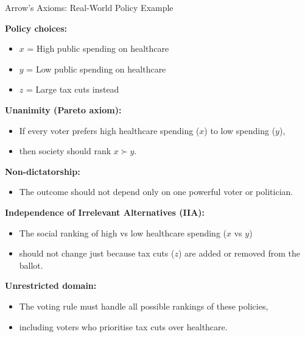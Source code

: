 \documentclass[10pt]{beamer}
\begin{document}
\begin{frame}[allowframebreaks]{Arrow’s Axioms: Real-World Policy Example}

\textbf{Policy choices:}
\begin{itemize}
\item $x$ = High public spending on healthcare
\item $y$ = Low public spending on healthcare
\item $z$ = Large tax cuts instead
\end{itemize}



\textbf{Unanimity (Pareto axiom):}
\begin{itemize}
\item If every voter prefers high healthcare spending ($x$) to low spending ($y$),
\item then society should rank $x \succ y$.
\end{itemize}
\framebreak
\textbf{Non-dictatorship:}
\begin{itemize}
\item The outcome should not depend only on one powerful voter or politician.
\end{itemize}

\textbf{Independence of Irrelevant Alternatives (IIA):}
\begin{itemize}
\item The social ranking of high vs low healthcare spending ($x$ vs $y$)
\item should not change just because tax cuts ($z$) are added or removed from the ballot.
\end{itemize}

\textbf{Unrestricted domain:}
\begin{itemize}
\item The voting rule must handle all possible rankings of these policies,
\item including voters who prioritise tax cuts over healthcare.
\end{itemize}

\end{frame}
\end{document}
